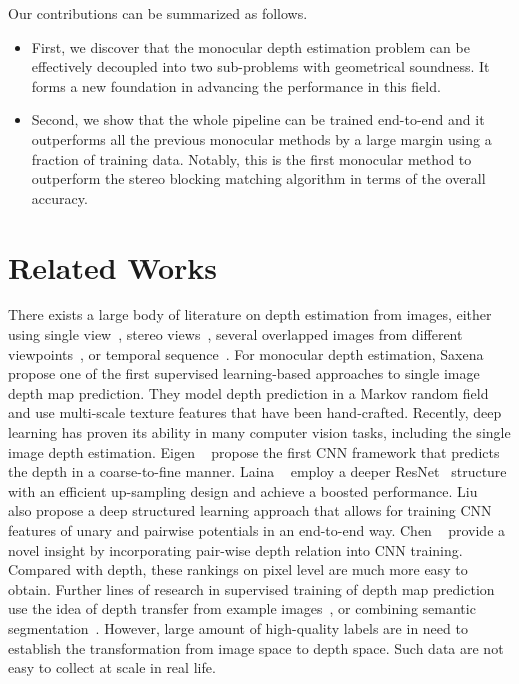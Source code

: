 \documentclass[10pt,twocolumn,letterpaper]{article}
\begin{document}
Our contributions can be summarized as follows.
\begin{itemize}
\item First, we discover that the monocular depth estimation problem can be effectively decoupled into two sub-problems with geometrical soundness. It forms a new foundation in advancing the performance in this field.
\item Second, we show that the whole pipeline can be trained end-to-end and it outperforms all the previous monocular methods by a large margin using a fraction of training data. Notably, this is the first monocular method to outperform the stereo blocking matching algorithm in terms of the overall accuracy.
\end{itemize}



\section{Related Works}
There exists a large body of literature on depth estimation from images, either using single view~\cite{saxena20083}, stereo views~\cite{scharstein2002taxonomy}, several overlapped images from different viewpoints~\cite{furukawa2015multi}, or temporal sequence~\cite{ranftl2016dense}.
For monocular depth estimation, Saxena \etal~\cite{saxena20083} propose one of the first supervised learning-based approaches to single image depth map prediction. They model depth prediction in a Markov random field and use multi-scale texture features that have been hand-crafted. Recently, deep learning has proven its ability in many computer vision tasks, including the single image depth estimation. Eigen \etal~\cite{eigen2014depth} propose the first CNN framework that predicts the depth in a coarse-to-fine manner. Laina \etal~\cite{laina2016deeper} employ a deeper ResNet~\cite{He2015res} structure with an efficient up-sampling design and achieve a boosted performance. Liu \etal~\cite{liu2015deep} also propose a deep structured learning approach that allows for training CNN features of unary and pairwise potentials in an end-to-end way. Chen \etal~\cite{chen2016wild} provide a novel insight by incorporating pair-wise depth relation into CNN training. Compared with depth, these rankings on pixel level are much more easy to obtain. Further lines of research in supervised training of depth map prediction use the idea of depth transfer from example images~\cite{karsch2012depth, konrad20122d, liu2014discrete}, or combining semantic segmentation~\cite{eigen2015predicting,ladicky2014pulling,li2010towards,liu2010single,
wang2015towards}. However, large amount of high-quality labels are in need to establish the transformation from image space to depth space. Such data are not easy to collect at scale in real life.  
\end{document}

